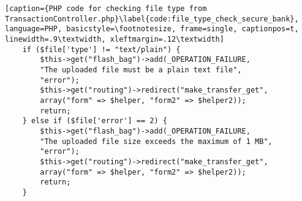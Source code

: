 \begin{lstlisting}[caption={PHP code for checking file type from TransactionController.php}\label{code:file_type_check_secure_bank}, language=PHP, basicstyle=\footnotesize, frame=single, captionpos=t, linewidth=.9\textwidth, xleftmargin=.12\textwidth]
    if ($file['type'] != "text/plain") {
        $this->get("flash_bag")->add(_OPERATION_FAILURE,
        "The uploaded file must be a plain text file",
        "error");
        $this->get("routing")->redirect("make_transfer_get",
        array("form" => $helper, "form2" => $helper2));
        return;
    } else if ($file['error'] == 2) {
        $this->get("flash_bag")->add(_OPERATION_FAILURE,
        "The uploaded file size exceeds the maximum of 1 MB",
        "error");
        $this->get("routing")->redirect("make_transfer_get",
        array("form" => $helper, "form2" => $helper2));
        return;
    }
\end{lstlisting}
\clearpage
